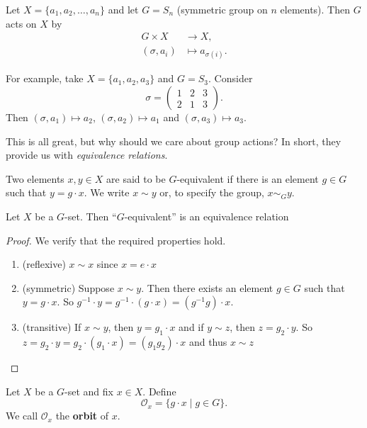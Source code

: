 \begin{example}
	Let $X=\{a_1,a_2,\hdots,a_n\}$ and let $G=S_n$ (symmetric group on $n$ elements). Then $G$ acts on $X$ by
	\begin{align*}
		G\times X&\to X,\\
		(\sigma,a_i)&\mapsto a_{\sigma(i)}.
	\end{align*}

	For example, take $X=\{a_1,a_2,a_3\}$ and $G=S_3$. Consider
	$$\sigma=\begin{pmatrix}
		1 & 2 & 3 \\ 2 & 1 & 3
	\end{pmatrix}.$$
	Then $(\sigma,a_1)\mapsto a_2$, $(\sigma, a_2)\mapsto a_1$ and $(\sigma, a_3)\mapsto a_3$.
\end{example}

This is all great, but why should we care about group actions? In short, they provide us with \textit{equivalence relations}.

\begin{definition}
	Two elements $x,y\in X$ are said to be $G$-equivalent if there is an element $g\in G$ such that $y=g\cdot x$. We write $x\sim y$ or, to specify the group, $x\sim_G y$.
\end{definition}

\begin{theorem}
	Let $X$ be a $G$-set. Then ``$G$-equivalent'' is an equivalence relation
\end{theorem}

\begin{proof}
	We verify that the required properties hold.
	\begin{enumerate}[label=\textbf{(\alph*)}]
		\item (reflexive) $x\sim x$ since $x=e\cdot x$
		\item (symmetric) Suppose $x\sim y$. Then there exists an element $g\in G$ such that $y=g\cdot x$. So $g^{-1}\cdot y=g^{-1}\cdot (g\cdot x)=(g^{-1}g)\cdot x$.
		\item (transitive) If $x\sim y$, then $y=g_1\cdot x$ and if $y\sim z$, then $z=g_2\cdot y$. So $z=g_2\cdot y=g_2\cdot (g_1\cdot x)=(g_1g_2)\cdot x$ and thus $x\sim z$
	\end{enumerate}
\end{proof}

\begin{definition}[orbit]
	Let $X$ be a $G$-set and fix $x\in X$. Define
	$$\mathcal O_x=\{g\cdot x\mid g\in G\}.$$
	We call $\mathcal O_x$ the \textbf{orbit} of $x$.
\end{definition}

